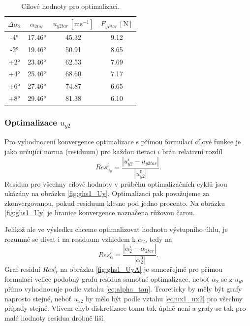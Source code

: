 \begin{table}
	\begin{ctucolortab}
		\begin{tabular}{c|c||c|c}
			
			$ \Delta\alpha_{2} $ &$ \alpha_{2tar} $ & $ u_{y2tar}\,[\mathrm{ms^{-1}}] $ & $ F_{yPtar}\,[\mathrm{N}] $ \\
			\hline
			-4° & 17.46° & 45.32 & 9.12 \\
			
			-2° & 19.46° & 50.91 & 8.65 \\
			
			+2° & 23.46° & 62.53 & 7.69 \\
			
			+4° & 25.46° & 68.60 & 7.17 \\
			
			+6° & 27.46° & 74.87 & 6.65 \\
			
			+8° & 29.46° & 81.38 & 6.10 \\
			
		\end{tabular}
	\end{ctucolortab}
	\caption{Cílové hodnoty pro optimalizaci.}
	\label{tab:cilove_hodnoty}
\end{table}

\subsubsection{Optimalizace $ u_{y2} $}


Pro vyhodnocení konvergence optimalizace s přímou formulací cílové funkce je jako určující norma (residuum) pro každou iteraci $ i $ brán relativní rozdíl
\begin{equation}\label{eq:res_uy}
Res_{u_{y}}^i=\dfrac{|u_{y2}^i-u_{y2tar}|}{|u_{y2}^0|}.
\end{equation}
Residua pro všechny cílové hodnoty v průběhu optimalizačních cyklů jsou ukázány na obrázku \ref{fig:ghs1_Uy}.
Optimalizaci pak považujeme za zkonvergovanou, pokud residuum klesne pod jedno procento. Na obrázku \ref{fig:ghs1_Uy} je hranice konvergence naznačena růžovou čarou.

Jelikož ale ve výsledku chceme optimalizovat hodnotu výstupního úhlu, je rozumné se dívat i na residuum vzhledem k $ \alpha_2 $, tedy na 
\begin{equation}\label{eq:res_alpha}
Res_{\alpha}^i=\dfrac{|\alpha_{2}^i-\alpha_{2tar}|}{|\alpha_{2}^0|}.
\end{equation}
Graf residuí $ Res_{\alpha}^i $ na obrázku \ref{fig:ghs1_UyA} je samozřejmě pro přímou formulaci velice podobný grafu residua samotné optimalizace, neboť $ \alpha_2 $ se z $ u_{y2} $ přímo vyhodnocuje podle vztahu \ref{eq:alpha_tan}. Teoreticky by měly být grafy naprosto stejné, neboť $ u_{x2} $ by mělo být podle vztahu \ref{eq:ux1_ux2} pro všechny případy stejné. Vlivem chyb diskretizace tomu tak úplně není a grafy se tak pro malé hodnoty residua drobně liší.

